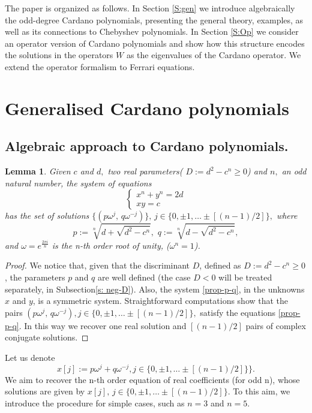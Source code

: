 \documentclass[11pt,reqno]{amsart}
\newtheorem{lemma}[theorem]{Lemma}
\begin{document}
 The paper is organized as follows. In Section \eqref{S:gen}  we introduce algebraically the odd-degree Cardano  polynomials, presenting the general theory, examples, as well as its connections to Chebyshev polynomials. In Section \eqref{S:Op} we consider an operator version of Cardano polynomials and show how this structure encodes the solutions in the operators $W$  as the eigenvalues of the Cardano operator. We extend the operator formalism to Ferrari equations.
 \vspace{0.3cm}
\section{Generalised Cardano  polynomials}\label{S:gen}
\subsection{Algebraic approach to Cardano polynomials.}
\begin{lemma}
    Given $c $ and  $d, $ two real parameters( $D:=d^2-c^n\geq 0$) and $n,$ an odd natural number,   the system of equations \begin{equation}\label{prop-p-q}
    \begin{cases}
        x^n+y^n=2d\\
         xy=c
    \end{cases}
     \end{equation}
has the set of solutions $\{(p\omega^{j},\,q\omega^{-j})\},\, j\in\{0,\pm 1,\ldots \pm [(n-1)/2]\},$  where
\begin{equation}\label{defp-q}
    p:=\sqrt[n]{d+\sqrt{d^2-c^n}} ,\,\, q:=\sqrt[n]{d-\sqrt{d^2-c^n}},\end{equation}
and     $\omega=e^{\frac{2\pi i}{n}}$ is the n-th order root of unity, ($\omega^n=1$).
\end{lemma}
  \begin{proof}
We notice that, given that the discriminant $D$, defined as $D:=d^2-c^n\geq 0$, the parameters $p$ and $q$ are well defined (the case $D<0$ will be treated separately, in Subsection{\eqref{s: neg-D}}).
Also, the system \eqref{prop-p-q}, in the unknowns $x$ and $y$, is a  symmetric system. Straightforward computations show that the pairs $(p\omega^{j},\,q\omega^{-j}), j\in\{0,\pm 1,\ldots \pm [(n-1)/2]\},$ satisfy the equations \eqref{prop-p-q}. In this way we recover  one real solution and $[(n-1)/2]$ pairs of complex conjugate solutions.
  \end{proof}

Let us denote \begin{equation}\label{j-root} x[j]:=p\omega^{j}+q\omega^{-j},j\in\{0,\pm 1,\ldots \pm [(n-1)/2]\}\}.\end{equation}  We aim to recover the n-th order equation of real coefficients (for odd n), whose solutions are given by $x[j],\,j\in \{0,\pm 1,\ldots \pm[(n-1)/2]\}$.
To this aim, we introduce the procedure for simple cases, such as $n=3$ and $n=5$.
\end{document}
